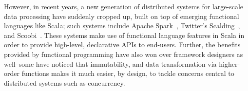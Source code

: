 \documentclass[preprint]{sigplanconf}
\theoremstyle{definition}
\theoremstyle{definition}
\newcommand{\fixme}[1]{{\color{gray}\itshape#1}}
\begin{document}
However, in recent years, a new generation of distributed systems for
large-scale data processing have suddenly cropped up, built on top of emerging
functional languages like Scala; such systems include Apache Spark~\cite{Spark},
Twitter's Scalding~\cite{Scalding}, and Scoobi~\cite{Scoobi}. These systems make
use of functional language features in Scala in order to provide high-level,
declarative APIs to end-users. Further, the benefits provided by functional
programming have also won over framework designers as well--some have noticed
that immutability, and data transformation via higher-order functions makes it
much easier, by design, to tackle concerns central to distributed systems such
as concurrency.




%
%
%
%
\end{document}
